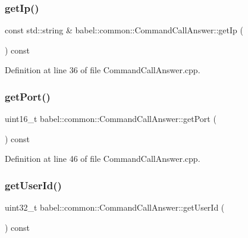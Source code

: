 \subsubsection{\texorpdfstring{get\+Ip()}{getIp()}}
{\footnotesize\ttfamily const std\+::string \& babel\+::common\+::\+Command\+Call\+Answer\+::get\+Ip (\begin{DoxyParamCaption}{ }\end{DoxyParamCaption}) const}



Definition at line 36 of file Command\+Call\+Answer.\+cpp.

\mbox{\label{classbabel_1_1common_1_1_command_call_answer_ad1cac368e900d906c5cb64d5ceea79dd}} 
\subsubsection{\texorpdfstring{get\+Port()}{getPort()}}
{\footnotesize\ttfamily uint16\+\_\+t babel\+::common\+::\+Command\+Call\+Answer\+::get\+Port (\begin{DoxyParamCaption}{ }\end{DoxyParamCaption}) const}



Definition at line 46 of file Command\+Call\+Answer.\+cpp.

\mbox{\label{classbabel_1_1common_1_1_command_call_answer_ad087adbb95d921407eb74f4e3c0cff9d}} 
\subsubsection{\texorpdfstring{get\+User\+Id()}{getUserId()}}
{\footnotesize\ttfamily uint32\+\_\+t babel\+::common\+::\+Command\+Call\+Answer\+::get\+User\+Id (\begin{DoxyParamCaption}{ }\end{DoxyParamCaption}) const}



